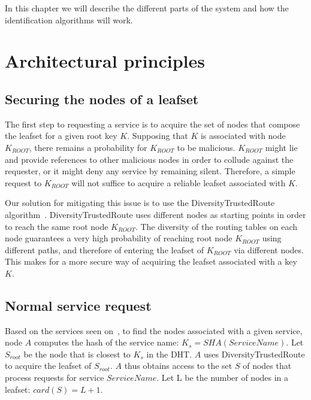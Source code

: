 
In this chapter we will describe the different parts of the system and how the
identification algorithms will work.

\section{Architectural principles}

\subsection{Securing the nodes of a leafset}

The first step to requesting a service is to acquire the set of nodes that
compose the leafset for a given root key $K$. Supposing that $K$ is associated
with node $K_{ROOT}$, there remains a probability for $K_{ROOT}$ to be
malicious. $K_{ROOT}$ might lie and provide references to other malicious nodes
in order to collude against the requester, or it might deny any service by
remaining silent. Therefore, a simple request to $K_{ROOT}$ will not suffice to
acquire a reliable leafset associated with $K$.

Our solution for mitigating this issue is to use the DiversityTrustedRoute
algorithm~\cite{diversity_trusted_route}. DiversityTrustedRoute uses different
nodes as starting points in order to reach the same root node $K_{ROOT}$. The
diversity of the routing tables on each node guarantees a very high probability
of reaching root node $K_{ROOT}$ using different paths, and therefore of
entering the leafset of $K_{ROOT}$ via different nodes. This makes for a more
secure way of acquiring the leafset associated with a key $K$.

\subsection{Normal service request}

Based on the services seen on~\cite{p2p_certification}, to find the nodes associated with a given
service, node $A$ computes the hash
of the service name: $K_s = SHA(ServiceName)$. Let $S_{root} $ be the node that
is closest to $K_s$ in the DHT. $A$ uses DiversityTrustedRoute to acquire the
leafset of $S_{root}$. $A$ thus obtains access to the set $S$ of nodes that
process requests for service $ServiceName$. Let L be the number of nodes in a
leafset: $card(S) = L + 1$.

